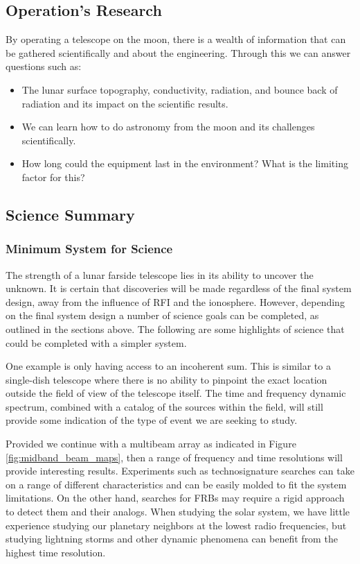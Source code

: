 \subsection{Operation's Research}
By operating a telescope on the moon, there is a wealth of information that can be gathered scientifically and about the engineering. Through this we can answer questions such as:

\begin{itemize}
    \item The lunar surface topography, conductivity, radiation, and bounce back of radiation and its impact on the scientific results.
    \item We can learn how to do astronomy from the moon and its challenges scientifically. 
    \item How long could the equipment last in the environment? What is the limiting factor for this?
\end{itemize}

\subsection{Science Summary}
\subsubsection{Minimum System for Science}
The strength of a lunar farside telescope lies in its ability to uncover the unknown. It is certain that discoveries will be made regardless of the final system design, away from the influence of RFI and the ionosphere. However, depending on the final system design a number of science goals can be completed, as outlined in the sections above. The following are some highlights of science that could be completed with a simpler system. 

One example is only having access to an incoherent sum. This is similar to a single-dish telescope where there is no ability to pinpoint the exact location outside the field of view of the telescope itself. The time and frequency dynamic spectrum, combined with a catalog of the sources within the field, will still provide some indication of the type of event we are seeking to study. 

Provided we continue with a multibeam array as indicated in Figure \ref{fig:midband_beam_maps}, then a range of frequency and time resolutions will provide interesting results. Experiments such as technosignature searches can take on a range of different characteristics and can be easily molded to fit the system limitations. On the other hand, searches for FRBs may require a rigid approach to detect them and their analogs. When studying the solar system, we have little experience studying our planetary neighbors at the lowest radio frequencies, but studying lightning storms and other dynamic phenomena can benefit from the highest time resolution.  


